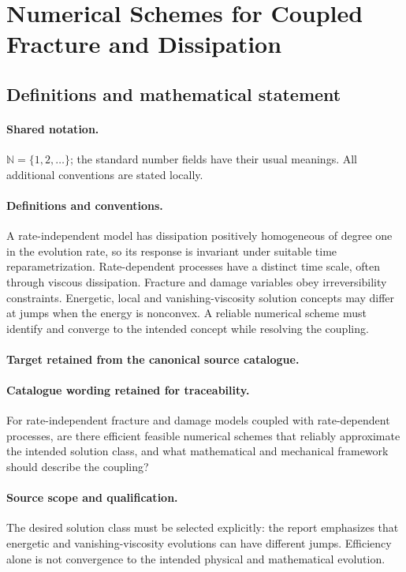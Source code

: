 \documentclass[11pt]{article}
\begin{document}
\section{Numerical Schemes for Coupled Fracture and Dissipation}\label{statement}

\subsection{Definitions and mathematical statement}

\paragraph{Shared notation.}$\mathbb N=\{1,2,\ldots\}$; the standard number fields have their usual meanings. All additional conventions are stated locally.


\paragraph{Definitions and conventions.}
A rate-independent model has dissipation positively homogeneous of degree one in the evolution rate, so its response is invariant under suitable time reparametrization. Rate-dependent processes have a distinct time scale, often through viscous dissipation. Fracture and damage variables obey irreversibility constraints. Energetic, local and vanishing-viscosity solution concepts may differ at jumps when the energy is nonconvex. A reliable numerical scheme must identify and converge to the intended concept while resolving the coupling.

\paragraph{Target retained from the canonical source catalogue.}
\paragraph{Catalogue wording retained for traceability.}
For rate-independent fracture and damage models coupled with rate-dependent processes, are there efficient feasible numerical schemes that reliably approximate the intended solution class, and what mathematical and mechanical framework should describe the coupling?

\paragraph{Source scope and qualification.}
The desired solution class must be selected explicitly: the report emphasizes that energetic and vanishing-viscosity evolutions can have different jumps. Efficiency alone is not convergence to the intended physical and mathematical evolution.
\end{document}
